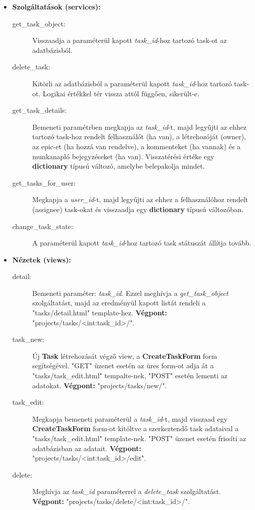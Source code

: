 \begin{itemize}
	\item \textbf{Szolgáltatások (services):}
	\begin{description}
		\item[get\_task\_object:] Visszaadja a paraméterül kapott \textit{task\_id}-hoz tartozó task-ot az adatbázisból.
		\item[delete\_task:] Kitörli az adatbázisból a paraméterül kapott \textit{task\_id}-hoz tartozó task-ot. Logikai értékkel tér vissza attól függően, sikerült-e.
		\item[get\_task\_details:] Bemeneti paramétrben megkapja az  \textit{task\_id}-t, majd legyűjti az ehhez tartozó task-hoz rendelt felhasználót (ha van), a létrehozóját (owner), az epic-et (ha hozzá van rendelve), a kommenteket (ha vannak) és a munkanapló bejegyzéseket (ha van). Visszatérési értéke egy \textbf{dictionary} típusú változó, amelybe belepakolja mindet.
		\item[get\_tasks\_for\_user:] Megkapja a \textit{user\_id}-t, majd legyűjti az ehhez a felhasználóhoz rendelt (assignee) task-okat és visszaadja egy \textbf{dictionary} típusú változóban.
		\item[change\_task\_state:] A paraméterül kapott \textit{task\_id}-hoz tartozó task státuszát állítja tovább.
	\end{description}
	\item \textbf{Nézetek (views):}
	\begin{description}
		\item[detail:] Bemeneti paraméter: \textit{task\_id}. Ezzel meghívja a \textit{get\_task\_object} szolgáltatást, majd az eredményül kapott listát rendeli a "tasks/detail.html" template-hez. \textbf{Végpont:} "projects/tasks/<int:task\_id>/".
		\item[task\_new:] Új \textbf{Task} létrehozását végző view, a \textbf{CreateTaskForm} form segítségével. "GET" üzenet esetén az üres form-ot adja át a "tasks/task\_edit.html" tempalte-nek, "POST" esetén lementi az adatokat. \textbf{Végpont:} "projects/tasks/new/".
		\item[task\_edit:] Megkapja bemeneti paraméterül a \textit{task\_id}-t, majd visszaad egy \textbf{CreateTaskForm} form-ot kitöltve a szerkeztendő task adataival a "tasks/task\_edit.html" template-nek. "POST" üzenet esetén frissíti az adatbázisban az adatait. \textbf{Végpont:} "projects/tasks/<int:task\_id>/edit".
		\item[delete:] Meghívja az \textit{task\_id} paraméterrel a \textit{delete\_task} szolgáltatást. \textbf{Végpont:} "projects/tasks/delete/<int:task\_id>/".

\end{description}
\end{itemize}
